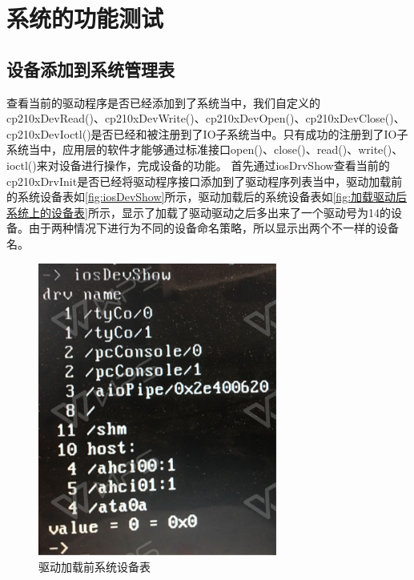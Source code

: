 \chapter{系统的功能测试}
\section{设备添加到系统管理表}
	查看当前的驱动程序是否已经添加到了系统当中，我们自定义的cp210xDevRead()、cp210xDevWrite()、cp210xDevOpen()、cp210xDevClose()、cp210xDevIoctl()是否已经和被注册到了IO子系统当中。只有成功的注册到了IO子系统当中，应用层的软件才能够通过标准接口open()、close()、read()、write()、ioctl()来对设备进行操作，完成设备的功能。
	首先通过iosDrvShow查看当前的cp210xDrvInit是否已经将驱动程序接口添加到了驱动程序列表当中，驱动加载前的系统设备表如\autoref{fig:iosDevShow}所示，驱动加载后的系统设备表如\autoref{fig:加载驱动后系统上的设备表}所示，显示了加载了驱动驱动之后多出来了一个驱动号为14的设备。由于两种情况下进行为不同的设备命名策略，所以显示出两个不一样的设备名。
\begin{figure}[!h]
\centering
\includegraphics[width=0.7\textwidth ,height = 0.4\textwidth]{./graphics/iosDevShow.pdf}
\caption{驱动加载前系统设备表}\label{fig:iosDevShow}
\end{figure}


